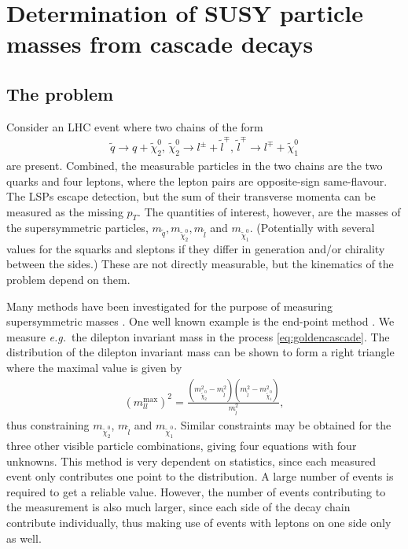 \documentclass[twoside,english]{uiofysmaster}
\begin{document}
\chapter{Determination of SUSY particle masses from cascade decays}%
\label{ch:introducing_the_method}




\section{The problem}
Consider an LHC event where two chains of the form
\begin{align}
	\tilde{q} \to q + \tilde{\chi}_2^0, \, \tilde{\chi}_2^0 \to l^{\pm} + \tilde{l}^\mp, \, \tilde{l}^\mp \to l^\mp + \tilde{\chi}_1^0\label{eq:goldencascade}
\end{align}
are present. Combined, the measurable particles in the two chains are the two quarks and four leptons, where the lepton pairs are opposite-sign same-flavour. The LSPs escape detection, but the sum of their transverse momenta can be measured as the missing $p_T$. The quantities of interest, however, are the masses of the supersymmetric particles, $m_{\tilde{q}}, m_{\tilde{\chi}_2^0}, m_{\tilde{l}}$ and $m_{\tilde{\chi}_1^0}$. (Potentially with several values for the squarks and sleptons if they differ in generation and/or chirality between the sides.) These are not directly measurable, but the kinematics of the problem depend on them. 

Many methods have been investigated for the purpose of measuring supersymmetric masses \cite{Barr:2010zj}. One well known example is the end-point method \cite{1126-6708-2000-09-004}. We measure {\it e.g.}\ the dilepton invariant mass in the process \eqref{eq:goldencascade}. The distribution of the dilepton invariant mass can be shown to form a right triangle where the maximal value is given by
\begin{align}
	(m_{ll}^\mathrm{max})^2 = \frac{ \left( m^2_{\tilde{\chi}_2^0} - m^2_{\tilde{l}} \right) \left( m^2_{\tilde{l}} - m^2_{\tilde{\chi}_1^0} \right)}{m^2_{\tilde{l}}}, \label{eq:invariant_mass_endpoint}
\end{align}
thus constraining $m_{\tilde{\chi}_2^0}$, $m_{\tilde{l}}$ and $m_{\tilde{\chi}_1^0}$. Similar constraints may be obtained for the three other visible particle combinations, giving four equations with four unknowns. This method is very dependent on statistics, since each measured event only contributes one point to the distribution. A large number of events is required to get a reliable value. However, the number of events contributing to the measurement is also much larger, since each side of the decay chain contribute individually, thus making use of events with leptons on one side only as well.
\end{document}

